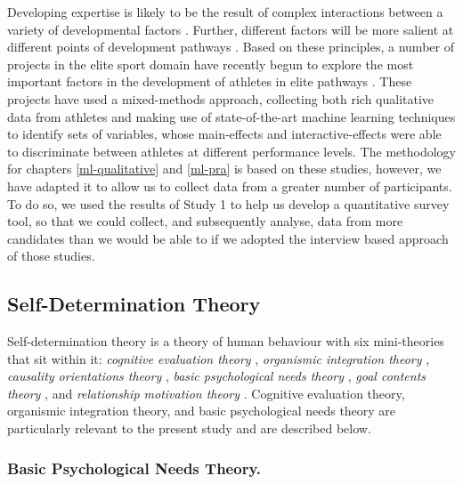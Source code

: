 \documentclass[
  12pt,
  a4paper,
]{book}
\begin{document}
Developing expertise is likely to be the result of complex interactions between a variety of developmental factors \citep[e.g., practice and training, personality traits, motivation, social support;][]{Baker2013, Gagne2004, Johnston2018}. Further, different factors will be more salient at different points of development pathways \citep{Rees2016}. Based on these principles, a number of projects in the elite sport domain have recently begun to explore the most important factors in the development of athletes in elite pathways \citep[e.g.,][]{Gullich2019, Hardy2017, Jones2019a, Jones2019b, Jones2020, Rees2016}. These projects have used a mixed-methods approach, collecting both rich qualitative data from athletes and making use of state-of-the-art machine learning techniques to identify sets of variables, whose main-effects and interactive-effects were able to discriminate between athletes at different performance levels. The methodology for chapters \ref{ml-qualitative} and \ref{ml-pra} is based on these studies, however, we have adapted it to allow us to collect data from a greater number of participants. To do so, we used the results of Study 1 to help us develop a quantitative survey tool, so that we could collect, and subsequently analyse, data from more candidates than we would be able to if we adopted the interview based approach of those studies.

\hypertarget{gen-intro-sdt}{%
\subsection{Self-Determination Theory}\label{gen-intro-sdt}}

Self-determination theory \citep{Deci1985b, Deci2000, Ryan2017} is a theory of human behaviour with six mini-theories that sit within it: \emph{cognitive evaluation theory} \citep{Deci1975, Deci1980}, \emph{organismic integration theory} \citep{Deci1985b, Ryan1989}, \emph{causality orientations theory} \citep{Deci1985a}, \emph{basic psychological needs theory} \citep{Ryan2000a}, \emph{goal contents theory} \citep{Kasser1996, Niemiec2009}, and \emph{relationship motivation theory} \citep{Deci2014, Ryan2017}. Cognitive evaluation theory, organismic integration theory, and basic psychological needs theory are particularly relevant to the present study and are described below.

\hypertarget{basic-psychological-needs-theory.}{%
\subsubsection{Basic Psychological Needs Theory.}\label{basic-psychological-needs-theory.}}
\end{document}
